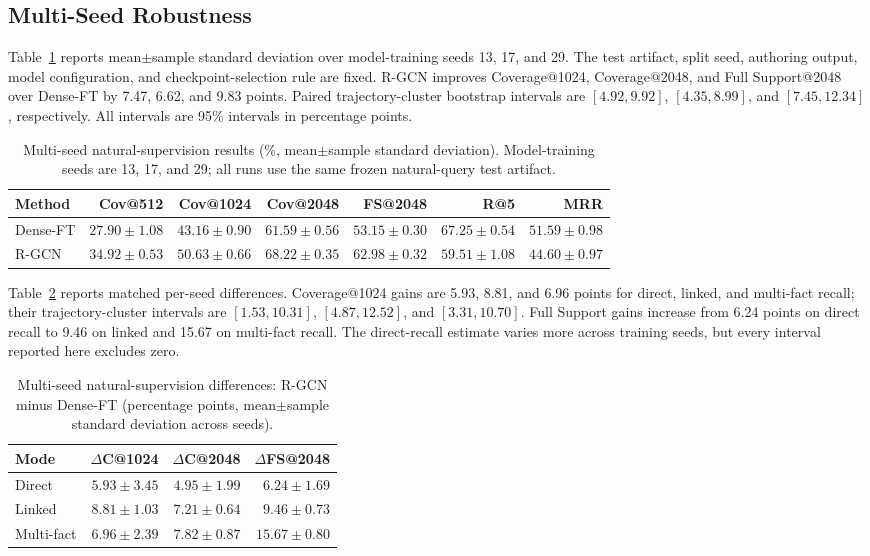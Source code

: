 \documentclass[sigconf,anonymous,review]{acmart}
\begin{document}
\subsection{Multi-Seed Robustness}
\label{sec:multiseed}

Table~\ref{tab:multiseed} reports mean$\pm$sample standard deviation over model-training seeds 13, 17, and 29. The test artifact, split seed, authoring output, model configuration, and checkpoint-selection rule are fixed. R-GCN improves Coverage@1024, Coverage@2048, and Full Support@2048 over Dense-FT by 7.47, 6.62, and 9.83 points. Paired trajectory-cluster bootstrap intervals are $[4.92,9.92]$, $[4.35,8.99]$, and $[7.45,12.34]$, respectively. All intervals are 95\% intervals in percentage points.

\begin{table}[t]
\centering
\small
\begin{tabular}{lrrrrrr}
\hline
Method & Cov@512 & Cov@1024 & Cov@2048 & FS@2048 & R@5 & MRR \\
\hline
Dense-FT & $27.90{\pm}1.08$ & $43.16{\pm}0.90$ & $61.59{\pm}0.56$ & $53.15{\pm}0.30$ & $67.25{\pm}0.54$ & $51.59{\pm}0.98$ \\
R-GCN & $34.92{\pm}0.53$ & $50.63{\pm}0.66$ & $68.22{\pm}0.35$ & $62.98{\pm}0.32$ & $59.51{\pm}1.08$ & $44.60{\pm}0.97$ \\
\hline
\end{tabular}
\caption{Multi-seed natural-supervision results (\%, mean$\pm$sample standard deviation). Model-training seeds are 13, 17, and 29; all runs use the same frozen natural-query test artifact.}
\label{tab:multiseed}
\end{table}

Table~\ref{tab:multiseed-strata} reports matched per-seed differences. Coverage@1024 gains are 5.93, 8.81, and 6.96 points for direct, linked, and multi-fact recall; their trajectory-cluster intervals are $[1.53,10.31]$, $[4.87,12.52]$, and $[3.31,10.70]$. Full Support gains increase from 6.24 points on direct recall to 9.46 on linked and 15.67 on multi-fact recall. The direct-recall estimate varies more across training seeds, but every interval reported here excludes zero.

\begin{table}[t]
\centering
\small
\begin{tabular}{lrrr}
\hline
Mode & $\Delta$C@1024 & $\Delta$C@2048 & $\Delta$FS@2048 \\
\hline
Direct & $5.93{\pm}3.45$ & $4.95{\pm}1.99$ & $6.24{\pm}1.69$ \\
Linked & $8.81{\pm}1.03$ & $7.21{\pm}0.64$ & $9.46{\pm}0.73$ \\
Multi-fact & $6.96{\pm}2.39$ & $7.82{\pm}0.87$ & $15.67{\pm}0.80$ \\
\hline
\end{tabular}
\caption{Multi-seed natural-supervision differences: R-GCN minus Dense-FT (percentage points, mean$\pm$sample standard deviation across seeds).}
\label{tab:multiseed-strata}
\end{table}
\end{document}

